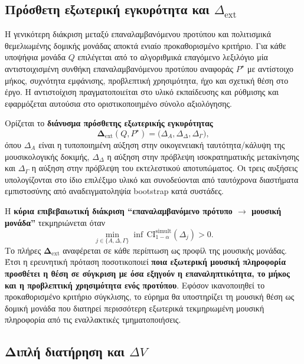 \documentclass[11pt,a4paper]{article}
\begin{document}
\subsection{\texorpdfstring{Πρόσθετη εξωτερική εγκυρότητα και \(\Delta_{\mathrm{ext}}\)}{Πρόσθετη εξωτερική εγκυρότητα και Delta ext}}\label{app:stats-ext}

Η γενικότερη διάκριση μεταξύ επαναλαμβανόμενου προτύπου και πολιτισμικά θεμελιωμένης δομικής μονάδας αποκτά ενιαίο προκαθορισμένο κριτήριο. Για κάθε υποψήφια μονάδα $Q$ επιλέγεται από το αλγοριθμικά επαγόμενο λεξιλόγιο μία αντιστοιχισμένη συνθήκη επαναλαμβανόμενου προτύπου αναφοράς $P^{\star}$ με αντίστοιχο μήκος, συχνότητα εμφάνισης, προβλεπτική χρησιμότητα, ήχο και σχετική θέση στο έργο. Η αντιστοίχιση πραγματοποιείται στο υλικό εκπαίδευσης και ρύθμισης και εφαρμόζεται αυτούσια στο οριστικοποιημένο σύνολο αξιολόγησης.

Ορίζεται το \textbf{διάνυσμα πρόσθετης εξωτερικής εγκυρότητας}
\[
\boldsymbol{\Delta}_{\mathrm{ext}}(Q,P^{\star})=
\bigl(\Delta_A,\Delta_{\Delta},\Delta_{\Gamma}\bigr),
\]
όπου $\Delta_A$ είναι η τυποποιημένη αύξηση στην οικογενειακή ταυτότητα/κάλυψη της μουσικολογικής δοκιμής, $\Delta_{\Delta}$ η αύξηση στην πρόβλεψη ισοκρατηματικής μετακίνησης και $\Delta_{\Gamma}$ η αύξηση στην πρόβλεψη του εκτελεστικού αποτυπώματος. Οι τρεις αυξήσεις υπολογίζονται στο ίδιο επιλέξιμο υλικό και συνοδεύονται από ταυτόχρονα διαστήματα εμπιστοσύνης από αναδειγματοληψία bootstrap κατά συστάδες.

Η \textbf{κύρια επιβεβαιωτική διάκριση ``επαναλαμβανόμενο πρότυπο $\rightarrow$ μουσική μονάδα''} τεκμηριώνεται όταν
\[
\min_{j\in\{A,\Delta,\Gamma\}}
\inf\,\mathrm{CI}^{\mathrm{simult}}_{1-\alpha}(\Delta_j)>0.
\]
Το πλήρες $\boldsymbol{\Delta}_{\mathrm{ext}}$ αναφέρεται σε κάθε περίπτωση ως προφίλ της μουσικής μονάδας. Έτσι η ερευνητική πρόταση ποσοτικοποιεί \textbf{ποια εξωτερική μουσική πληροφορία προσθέτει η θέση σε σύγκριση με όσα εξηγούν η επαναληπτικότητα, το μήκος και η προβλεπτική χρησιμότητα ενός προτύπου}.
Εφόσον ικανοποιηθεί το προκαθορισμένο κριτήριο σύγκλισης, το εύρημα θα υποστηρίζει τη μουσική θέση ως δομική μονάδα που διατηρεί περισσότερη εξωτερικά τεκμηριωμένη μουσική πληροφορία από τις εναλλακτικές τμηματοποιήσεις.

\subsection{\texorpdfstring{Διπλή διατήρηση και \(\Delta V\)}{Διπλή διατήρηση και Delta V}}\label{app:stats-double}
\end{document}
